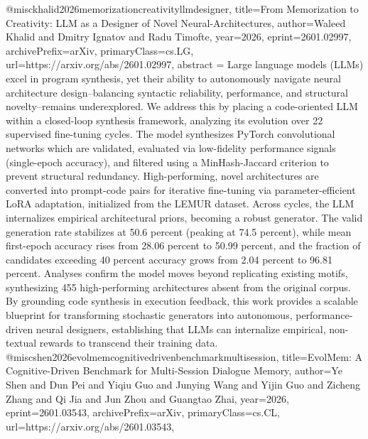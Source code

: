 {}@misc{khalid2026memorizationcreativityllmdesigner,
      title={From Memorization to Creativity: LLM as a Designer of Novel Neural-Architectures}, 
      author={Waleed Khalid and Dmitry Ignatov and Radu Timofte},
      year={2026},
      eprint={2601.02997},
      archivePrefix={arXiv},
      primaryClass={cs.LG},
      url={https://arxiv.org/abs/2601.02997},
      abstract = {Large language models (LLMs) excel in program synthesis, yet their ability to autonomously navigate neural architecture design--balancing syntactic reliability, performance, and structural novelty--remains underexplored. We address this by placing a code-oriented LLM within a closed-loop synthesis framework, analyzing its evolution over 22 supervised fine-tuning cycles. The model synthesizes PyTorch convolutional networks which are validated, evaluated via low-fidelity performance signals (single-epoch accuracy), and filtered using a MinHash-Jaccard criterion to prevent structural redundancy. High-performing, novel architectures are converted into prompt-code pairs for iterative fine-tuning via parameter-efficient LoRA adaptation, initialized from the LEMUR dataset. Across cycles, the LLM internalizes empirical architectural priors, becoming a robust generator. The valid generation rate stabilizes at 50.6 percent (peaking at 74.5 percent), while mean first-epoch accuracy rises from 28.06 percent to 50.99 percent, and the fraction of candidates exceeding 40 percent accuracy grows from 2.04 percent to 96.81 percent. Analyses confirm the model moves beyond replicating existing motifs, synthesizing 455 high-performing architectures absent from the original corpus. By grounding code synthesis in execution feedback, this work provides a scalable blueprint for transforming stochastic generators into autonomous, performance-driven neural designers, establishing that LLMs can internalize empirical, non-textual rewards to transcend their training data.}
}@misc{shen2026evolmemcognitivedrivenbenchmarkmultisession,
      title={EvolMem: A Cognitive-Driven Benchmark for Multi-Session Dialogue Memory}, 
      author={Ye Shen and Dun Pei and Yiqiu Guo and Junying Wang and Yijin Guo and Zicheng Zhang and Qi Jia and Jun Zhou and Guangtao Zhai},
      year={2026},
      eprint={2601.03543},
      archivePrefix={arXiv},
      primaryClass={cs.CL},
      url={https://arxiv.org/abs/2601.03543},
}

